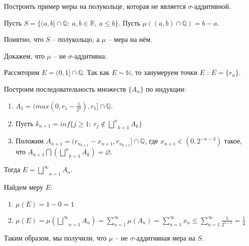 \begin{task}{6}
Построить пример меры на полукольце, которая не является $\sigma$-аддитивной.
\end{task}

\begin{solution}
Пусть $S = \lbrace (a, b] \cap \mathbb{Q} : ~ a, b \in \mathbb{R},~a \leq b  \rbrace$.
Пусть $\mu((a, b) \cap \mathbb{Q}) = b - a$.

Понятно, что $S$ -- полукольцо, а $\mu$ -- мера на нём.

Докажем, что $\mu$ -- не $\sigma$-аддитивна:

Рассмторим $E = (0, 1] \cap \mathbb{Q}$. Так как $E \sim \mathbb{N}$, то занумеруем точки $E$ : $E = \lbrace r_n \rbrace$.

Построим последовательность множеств $\lbrace A_n \rbrace$ по индукции:
\begin{enumerate}
    \item
    $A_1 = (max(0, r_1 - \frac{1}{2^3}), r_1] \cap \mathbb{Q}$.
    
    \item
    Пусть $k_{n+1} = inf \lbrace j \geq 1 : ~ r_j \notin \underset{k=1}{\overset{n}{\bigsqcup}} A_k \rbrace$
    
    \item
    Положим $A_{n+1} = (r_{n_{k+1}} - x_{n+1}, r_{n_{k+1}}] \cap \mathbb{Q}$, где $x_{n+1} \in (0, 2^{-n-3})$ такое, что $A_{n+1} \bigcap \left( \underset{k=1}{\overset{n}{\bigsqcup}} A_k \right) = \varnothing$.
\end{enumerate}

Тогда $E = \underset{n=1}{\overset{\infty}{\bigsqcup}} A_n$.

Найдем меру $E$:
\begin{enumerate}
    \item $\mu(E) = 1 - 0 = 1$
    
    \item $\mu(E) = \mu(\underset{n=1}{\overset{\infty}{\bigsqcup}} A_n) = \sum\limits_{n=1}^{\infty} \mu(A_n) = \sum\limits_{n=1}^{\infty} x_n \leq \sum\limits_{n=1}^{\infty} \frac{1}{2^{2+n}} = \frac{1}{4}$
\end{enumerate}

Таким образом, мы получили, что $\mu$ -- не $\sigma$-аддитивная мера на $S$.
\end{solution}